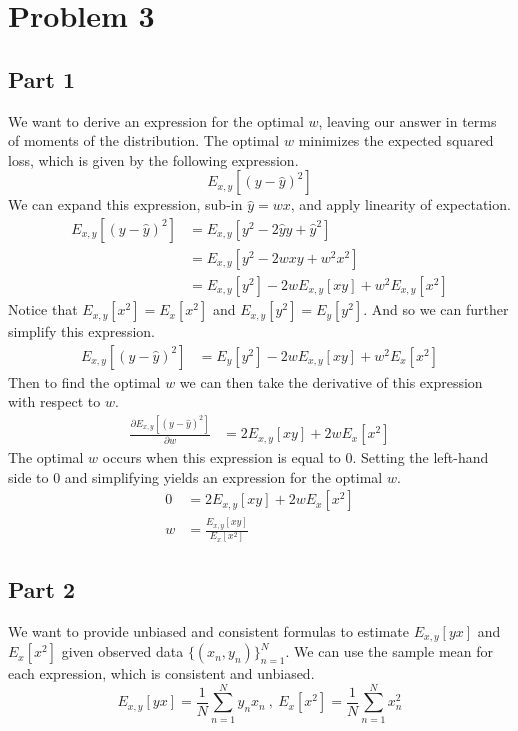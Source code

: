 \documentclass[submit]{harvardml}
\begin{document}
\newpage

\section{Problem 3}

\subsection{Part 1}
We want to derive an expression for the optimal $w$, leaving our answer in terms of moments of the distribution.
The optimal $w$ minimizes the expected squared loss, which is given by the following expression.
\begin{equation*}
    E_{x,y}[(y - \hat{y})^2]
\end{equation*}
We can expand this expression, sub-in $\hat{y} = w x$, and apply linearity of expectation.
\begin{align*}
    E_{x,y}[(y - \hat{y})^2] &= E_{x,y}[y^2 - 2\hat{y}y + \hat{y}^2]\\
    &= E_{x,y}[y^2 - 2 w x y + w^2 x^2]\\
    &= E_{x,y}[y^2] - 2 w E_{x,y}[x y] + w^2 E_{x,y}[x^2]
\end{align*}
Notice that $E_{x,y}[x^2] = E_x[x^2]$ and $E_{x,y}[y^2] = E_y[y^2]$. And so we can further simplify this expression.
\begin{align*}
    E_{x,y}[(y - \hat{y})^2] &= E_{y}[y^2] - 2 w E_{x,y}[x y] + w^2 E_{x}[x^2]
\end{align*}
Then to find the optimal $w$ we can then take the derivative of this expression with respect to $w$.
\begin{align*}
    \frac{\partial E_{x,y}[(y - \hat{y})^2]}{\partial w} &= 2 E_{x,y}[x y] + 2 w E_{x}[x^2]
\end{align*}
The optimal $w$ occurs when this expression is equal to $0$. Setting the left-hand side to $0$ and simplifying yields an expression for the optimal $w$.
\begin{align*}
    0 &= 2 E_{x,y}[x y] + 2 w E_{x}[x^2]\\
    w &= \frac{E_{x,y}[x y]}{E_{x}[x^2]}
\end{align*}

\subsection{Part 2}
We want to provide unbiased and consistent formulas to estimate $E_{x,y}[y x]$ and $E_x[x^2]$ given observed data $\{(x_n,y_n)\}_{n=1}^N$. We can use the sample mean for each expression, which is consistent and unbiased.
\begin{equation*}
    E_{x,y}[y x] = \frac{1}{N} \sum_{n=1}^N y_n x_n\ , \ E_x[x^2] = \frac{1}{N} \sum_{n=1}^N x_n^2
\end{equation*}
\end{document}
